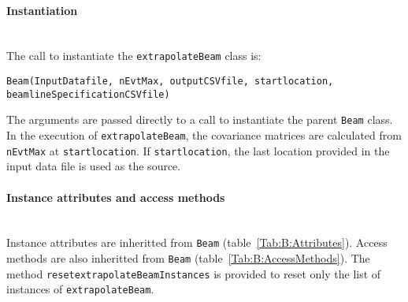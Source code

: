 \paragraph{Instantiation}\mbox{}\\
\noindent
The call to instantiate the \texttt{extrapolateBeam} class is:
\begin{center}
  \texttt{Beam(InputDatafile, nEvtMax, outputCSVfile,
  startlocation, beamlineSpecificationCSVfile)}
\end{center}
The arguments are passed directly to a call to instantiate the
parent \texttt{Beam} class.
In the execution of \texttt{extrapolateBeam}, the covariance matrices
are calculated from \texttt{nEvtMax} at \texttt{startlocation}.
If \texttt{startlocation}, the last location provided in the input
data file is used as the source.

\paragraph{Instance attributes and access methods}\mbox{}\\
\label{Para:B:InstAttr}
\noindent
Instance attributes are inheritted from \texttt{Beam} (table~\ref{Tab:B:Attributes}).
Access methods are also inheritted from \texttt{Beam}
(table~\ref{Tab:B:AccessMethods}).
The method \texttt{resetextrapolateBeamInstances} is provided to reset
only the list of instances of \texttt{extrapolateBeam}.


